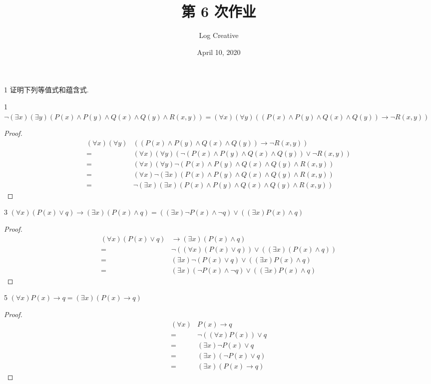 \documentclass[12pt]{article}
\title{第 6 次作业}
\author{Log Creative}
\date{April 10, 2020}
\newenvironment{firstlayer}%
{\begin{list}{}{\renewcommand{\makelabel}[1]{\textbf{##1}.\hfil}
}}
{\end{list}}
\newenvironment{secondlayer}%
{\begin{list}{}{\renewcommand{\makelabel}[1]{(##1)\hfil}
}}
{\end{list}}
\begin{document}
\begin{CJK}{UTF8}{gbsn}

\maketitle

\begin{firstlayer}
  \item[1]证明下列等值式和蕴含式.
  \begin{secondlayer}
    \item[1]$\neg (\exists x)(\exists y)(P(x)\wedge P(y)\wedge Q(x)\wedge Q(y)\wedge R(x,y))=(\forall x)(\forall y)((P(x)\wedge P(y)\wedge Q(x)\wedge Q(y))\rightarrow \neg R(x,y))$
    \begin{proof}
    \begin{align*}
      (\forall x)(\forall y)&((P(x)\wedge P(y)\wedge Q(x)\wedge Q(y))\rightarrow \neg R(x,y))\\
      =&(\forall x)(\forall y)(\neg (P(x)\wedge P(y)\wedge Q(x)\wedge Q(y))\vee \neg R(x,y))\\
      =&(\forall x)(\forall y)\neg(P(x)\wedge P(y)\wedge Q(x)\wedge Q(y)\wedge R(x,y))\\
      =&(\forall x)\neg(\exists x)(P(x)\wedge P(y)\wedge Q(x)\wedge Q(y)\wedge R(x,y))\\
      =&\neg(\exists x)(\exists x)(P(x)\wedge P(y)\wedge Q(x)\wedge Q(y)\wedge R(x,y))
    \end{align*}
    \end{proof}
    \item[3]$(\forall x)(P(x)\vee q)\rightarrow (\exists x)(P(x)\wedge q)=((\exists x)\neg P(x)\wedge \neg q)\vee ((\exists x)P(x)\wedge q)$
    \begin{proof}
    \begin{align*}
      (\forall x)(P(x)\vee q)&\rightarrow (\exists x)(P(x)\wedge q)\\
      =&\neg ((\forall x)(P(x)\vee q))\vee ((\exists x)(P(x)\wedge q))\\
      =&(\exists x)\neg(P(x)\vee q)\vee((\exists x)P(x)\wedge q)\\
      =&(\exists x)(\neg P(x)\wedge \neg q)\vee((\exists x)P(x)\wedge q)
    \end{align*}
      
    \end{proof}
    \item[5]$(\forall x)P(x)\rightarrow q=(\exists x)(P(x)\rightarrow q)$
    \begin{proof}
    \begin{align*}
      (\forall x)&P(x)\rightarrow q\\
      =&\neg ((\forall x)P(x))\vee q\\
      =&(\exists x)\neg P(x)\vee q\\
      =&(\exists x)(\neg P(x)\vee q)\\
      =&(\exists x)(P(x)\rightarrow q)
    \end{align*}
      

\end{proof}
\end{secondlayer}
\end{firstlayer}
\end{CJK}
\end{document}
